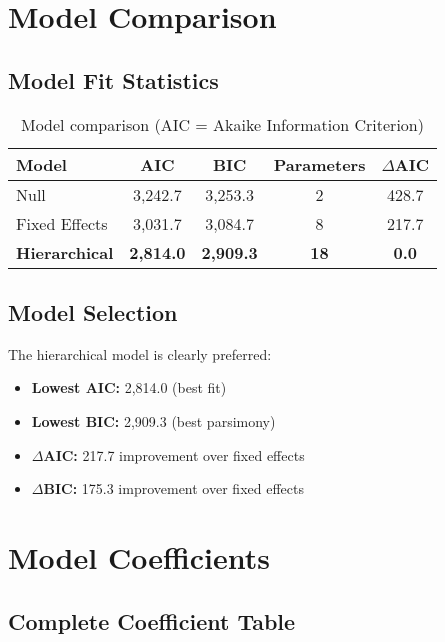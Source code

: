 \documentclass[11pt]{article}
\begin{document}
\section{Model Comparison}

\subsection{Model Fit Statistics}

\begin{table}[h]
\centering
\begin{tabular}{lcccc}
\toprule
\textbf{Model} & \textbf{AIC} & \textbf{BIC} & \textbf{Parameters} & \textbf{$\Delta$AIC} \\
\midrule
Null & 3,242.7 & 3,253.3 & 2 & 428.7 \\
Fixed Effects & 3,031.7 & 3,084.7 & 8 & 217.7 \\
\textbf{Hierarchical} & \textbf{2,814.0} & \textbf{2,909.3} & \textbf{18} & \textbf{0.0} \\
\bottomrule
\end{tabular}
\caption{Model comparison (AIC = Akaike Information Criterion)}
\end{table}

\subsection{Model Selection}

The hierarchical model is clearly preferred:
\begin{itemize}
    \item \textbf{Lowest AIC:} 2,814.0 (best fit)
    \item \textbf{Lowest BIC:} 2,909.3 (best parsimony)
    \item \textbf{$\Delta$AIC:} 217.7 improvement over fixed effects
    \item \textbf{$\Delta$BIC:} 175.3 improvement over fixed effects
\end{itemize}

\section{Model Coefficients}

\subsection{Complete Coefficient Table}
\end{document}
